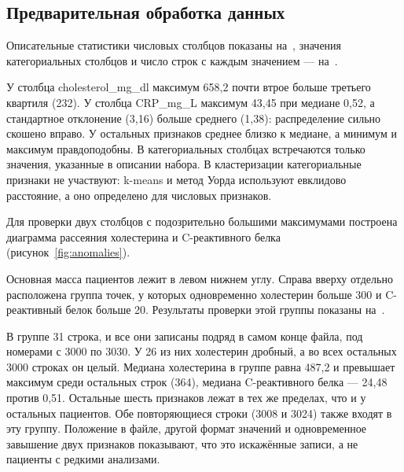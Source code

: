 \documentclass[a4paper,14pt]{extarticle}
\begin{document}
\subsection{Предварительная обработка данных}

Описательные статистики числовых столбцов показаны на~, значения категориальных столбцов и число строк с каждым значением — на~.



У столбца cholesterol\_mg\_dl максимум 658,2 почти втрое больше третьего квартиля (232). У столбца CRP\_mg\_L максимум 43,45 при медиане 0,52, а стандартное отклонение (3,16) больше среднего (1,38): распределение сильно скошено вправо. У остальных признаков среднее близко к медиане, а минимум и максимум правдоподобны. В категориальных столбцах встречаются только значения, указанные в описании набора. В кластеризации категориальные признаки не участвуют: k-means и метод Уорда используют евклидово расстояние, а оно определено для числовых признаков.

Для проверки двух столбцов с подозрительно большими максимумами построена диаграмма рассеяния холестерина и C-реактивного белка (рисунок~\ref{fig:anomalies}).


Основная масса пациентов лежит в левом нижнем углу. Справа вверху отдельно расположена группа точек, у которых одновременно холестерин больше 300 и C-реактивный белок больше 20. Результаты проверки этой группы показаны на~.


В группе 31 строка, и все они записаны подряд в самом конце файла, под номерами с 3000 по 3030. У 26 из них холестерин дробный, а во всех остальных 3000 строках он целый. Медиана холестерина в группе равна 487,2 и превышает максимум среди остальных строк (364), медиана C-реактивного белка — 24,48 против 0,51. Остальные шесть признаков лежат в тех же пределах, что и у остальных пациентов. Обе повторяющиеся строки (3008 и 3024) также входят в эту группу. Положение в файле, другой формат значений и одновременное завышение двух признаков показывают, что это искажённые записи, а не пациенты с редкими анализами.
\end{document}
